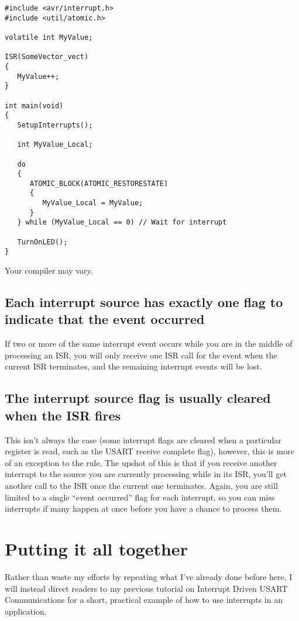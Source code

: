 \documentclass[a4paper,oneside,notitlepage]{book}
\begin{document}
\begin{center}
\begin{lstlisting}
#include <avr/interrupt.h>
#include <util/atomic.h>

volatile int MyValue;

ISR(SomeVector_vect)
{
   MyValue++;
}

int main(void)
{
   SetupInterrupts();

   int MyValue_Local;

   do
   {
      ATOMIC_BLOCK(ATOMIC_RESTORESTATE)
      {
         MyValue_Local = MyValue;
      }
   } while (MyValue_Local == 0) // Wait for interrupt

   TurnOnLED();
}
\end{lstlisting}
\end{center}

Your compiler may vary.

\section{Each interrupt source has exactly one flag to indicate that the event occurred}
If two or more of the same interrupt event occurs while you are in the middle of processing an ISR, you will only receive one ISR call for the event when the current ISR terminates, and the remaining interrupt events will be lost.

\section{The interrupt source flag is usually cleared when the ISR fires}
This isn't always the case (some interrupt flags are cleared when a particular register is read, such as the USART receive complete flag), however, this is more of an exception to the rule. The upshot of this is that if you receive another interrupt to the source you are currently processing while in its ISR, you'll get another call to the ISR once the current one terminates. Again, you are still limited to a single ``event occurred'' flag for each interrupt, so you can miss interrupts if many happen at once before you have a chance to process them.


\chapter{Putting it all together}
\label{chp:FinalWords}

Rather than waste my efforts by repeating what I've already done before here, I will instead direct readers to my previous tutorial on Interrupt Driven USART Communications for a short, practical example of how to use interrupts in an application.
\end{document}
